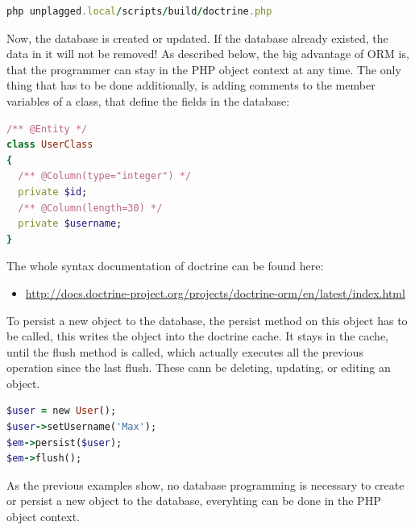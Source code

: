 \begin{lstlisting}[caption=Updating database structure, label=list:updatingDbStructure, language=Ruby]
php unplagged.local/scripts/build/doctrine.php
\end{lstlisting}

Now, the database is created or updated. If the database already existed, the data in it will not be removed! 
As described below, the big advantage of ORM is, that the programmer can stay in the PHP object context at any time. 
The only thing that has to be done additionally, is adding
comments to the member variables of a class, that define the fields in the database:

\begin{lstlisting}[caption=Defining a class in Doctrine, label=list:definingClassDoctrine, language=Ruby]
/** @Entity */
class UserClass
{
  /** @Column(type="integer") */
  private $id;
  /** @Column(length=30) */
  private $username;
}
\end{lstlisting}

The whole syntax documentation of doctrine can be found here: 

\begin{itemize}
\item \url{http://docs.doctrine-project.org/projects/doctrine-orm/en/latest/index.html} 
\end{itemize}

To persist a new object to the database, the persist method on this object has to be called, this writes the object 
into the doctrine cache. It stays in the cache, until the flush method is called, which actually executes all the 
previous operation since the last flush. These cann be deleting, updating, or editing an object.

\begin{lstlisting}[caption=Persisting an object to the database in Doctrine, label=list:persistingObjectDoctrine, language=Ruby]
$user = new User();
$user->setUsername('Max');
$em->persist($user);
$em->flush();
\end{lstlisting}

As the previous examples show, no database programming is necessary to create or persist a new object to the database, 
everyhting can be done in the PHP object context.
